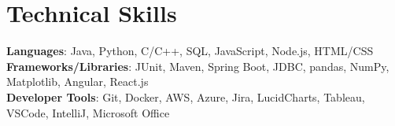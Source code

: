 \documentclass[letterpaper,11pt]{article}
\begin{document}
%
\section{Technical Skills}
 \begin{itemize}[leftmargin=0.15in, label={}]
    \small{\item{
     \textbf{Languages}{: Java, Python, C/C++, SQL, JavaScript, Node.js, HTML/CSS} \\
     \textbf{Frameworks/Libraries}{: JUnit, Maven, Spring Boot, JDBC, pandas, NumPy, Matplotlib, Angular, React.js} \\
     \textbf{Developer Tools}{: Git, Docker, AWS, Azure, Jira, LucidCharts, Tableau, VSCode, IntelliJ, Microsoft Office} \\
    }}
 \end{itemize}


\end{document}
